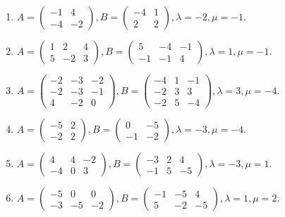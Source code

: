 \begin{enumerate}[label=\arabic*.,]
\item $A = \begin{pmatrix} -1 & 4 \\ -4 & -2 \end{pmatrix},  B = \begin{pmatrix} -4 & 1 \\ 2 & 2 \end{pmatrix},  \lambda = -2,  \mu = -1$.
\item $A = \begin{pmatrix} 1 & 2 & 4 \\ 5 & -2 & 3 \end{pmatrix},  B = \begin{pmatrix} 5 & -4 & -1 \\ -1 & -1 & 4 \end{pmatrix},  \lambda = 1,  \mu = -1$.
\item $A = \begin{pmatrix} -2 & -3 & -2 \\ -2 & -3 & -1 \\ 4 & -2 & 0 \end{pmatrix},  B = \begin{pmatrix} -4 & 1 & -1 \\ -2 & 3 & 3 \\ -2 & 5 & -4 \end{pmatrix},  \lambda = 3,  \mu = -4$.
\item $A = \begin{pmatrix} -5 & 2 \\ -2 & 2 \end{pmatrix},  B = \begin{pmatrix} 0 & -5 \\ -1 & -2 \end{pmatrix},  \lambda = -3,  \mu = -4$.
\item $A = \begin{pmatrix} 4 & 4 & -2 \\ -4 & 0 & 3 \end{pmatrix},  B = \begin{pmatrix} -3 & 2 & 4 \\ -1 & 5 & -5 \end{pmatrix},  \lambda = -3,  \mu = 1$.
\item $A = \begin{pmatrix} -5 & 0 & 0 \\ -3 & -5 & -2 \end{pmatrix},  B = \begin{pmatrix} -1 & -5 & 4 \\ 5 & -2 & -5 \end{pmatrix},  \lambda = 1,  \mu = 2$.

\end{enumerate}
